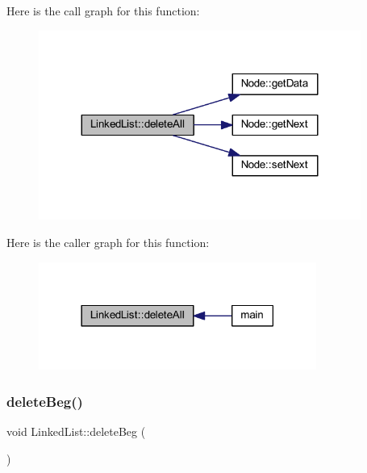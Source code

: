 Here is the call graph for this function\+:
\nopagebreak
\begin{figure}[H]
\begin{center}
\leavevmode
\includegraphics[width=299pt]{class_linked_list_a8b00d7145aa7ee83ba2e49623285e371_cgraph}
\end{center}
\end{figure}
Here is the caller graph for this function\+:
\nopagebreak
\begin{figure}[H]
\begin{center}
\leavevmode
\includegraphics[width=258pt]{class_linked_list_a8b00d7145aa7ee83ba2e49623285e371_icgraph}
\end{center}
\end{figure}
\mbox{\label{class_linked_list_af8ccdfe634eed9feae0c641766e2e867}} 
\subsubsection{\texorpdfstring{delete\+Beg()}{deleteBeg()}}
{\footnotesize\ttfamily void Linked\+List\+::delete\+Beg (\begin{DoxyParamCaption}{ }\end{DoxyParamCaption})}

